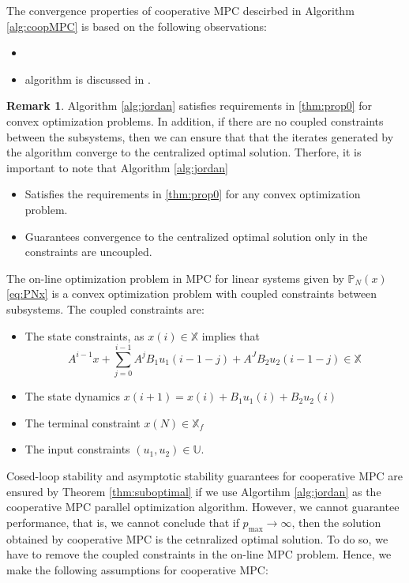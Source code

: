 \documentclass{article}
\theoremstyle{definition}
\newtheorem{remark}{Remark}
\begin{document}

The convergence properties of cooperative MPC descirbed in Algorithm
\ref{alg:coopMPC} is based on the following observations:

\begin{itemize}
\item 
\item algorithm is discussed in \citet[Section
3.3.5]{bertsekas:tsitsiklis:1989}.
\end{itemize}

\begin{remark}
\label{rem:performance}
Algorithm \ref{alg:jordan} satisfies requirements in \ref{thm:prop0}
for convex optimization problems. In addition, if there are no coupled
constraints between the subsystems, then we can ensure that that the
iterates generated by the algorithm converge to the centralized
optimal solution. Therfore, it is important to note that Algorithm
\ref{alg:jordan}
\begin{itemize}
\item Satisfies the requirements in \ref{thm:prop0} for any convex
  optimization problem.
\item Guarantees convergence to the centralized optimal solution only
  in the constraints are uncoupled.
\end{itemize}
\end{remark} 


The on-line optimization problem in MPC for linear systems given by
$\mathbb{P}_N(x)$ \eqref{eq:PNx} is a convex optimization problem with
coupled constraints between subsystems. The coupled constraints are:
\begin{itemize}
\item The state constraints, as $x(i) \in \mathbb{X}$ implies that
\[ A^{i-1}x +\sum_{j=0}^{i-1} A^jB_1u_1(i-1-j)+A^JB_2u_2(i-1-j) \in
\mathbb{X} \]
\item The state dynamics $x(i+1) = x(i) + B_1u_1(i) + B_2u_2(i)$
\item The terminal constraint $x(N) \in \mathbb{X}_f$
\item The input constraints $(u_1,u_2) \in \mathbb{U}$.
\end{itemize}

Cosed-loop stability and asymptotic stability  guarantees for
cooperative MPC are ensured by Theorem \ref{thm:suboptimal} if we use
Algortihm \ref{alg:jordan} as the cooperative MPC parallel
optimization algorithm. However,
we cannot guarantee performance, that is, we cannot conclude that if
$p_{\text{max}} \rightarrow \infty$, then the solution obtained by
cooperative MPC is the cetnralized optimal solution. To do so, we have
to remove the coupled constraints in the on-line MPC problem. Hence,
we make the following assumptions for cooperative MPC:
\end{document}

